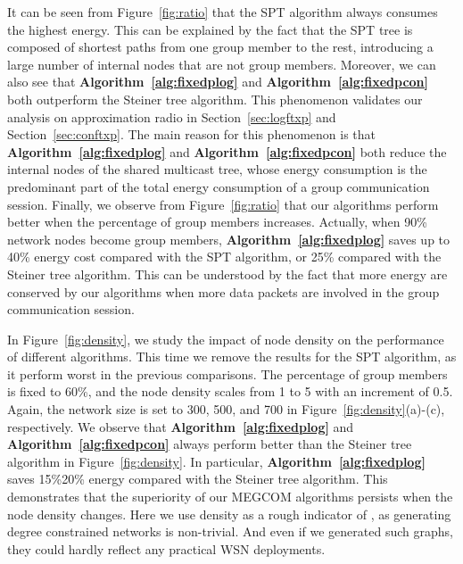 \documentclass[10pt, conference, compsocconf]{IEEEtran}
\begin{document}
It can be seen from Figure~\ref{fig:ratio} that the SPT algorithm always consumes the highest energy. This can be explained by the fact that the SPT tree is composed of shortest paths from one group member to the rest, introducing a large number of internal nodes that are not group members. Moreover, we can also see that \textbf{Algorithm~\ref{alg:fixedplog}} and \textbf{Algorithm~\ref{alg:fixedpcon}} both outperform the Steiner tree algorithm. This phenomenon validates our analysis on approximation radio in Section~\ref{sec:logftxp} and Section~\ref{sec:conftxp}. The main reason for this phenomenon is that \textbf{Algorithm~\ref{alg:fixedplog}} and \textbf{Algorithm~\ref{alg:fixedpcon}} both reduce the internal nodes of the shared multicast tree, whose energy consumption is the predominant part of the total energy consumption of a group communication session. Finally, we observe from Figure~\ref{fig:ratio} that our algorithms perform better when the percentage of group members increases. Actually, when 90\% network nodes become group members, \textbf{Algorithm~\ref{alg:fixedplog}} saves up to 40\% energy cost compared with the SPT algorithm, or 25\% compared with the Steiner tree algorithm. This can be understood by the fact that more energy are conserved by our algorithms when more data packets are involved in the group communication session.

  In Figure~\ref{fig:density}, we study the impact of node density on the performance of different algorithms. This time we remove the results for the SPT algorithm, as it perform worst in the previous comparisons. The percentage of group members is fixed to 60\%, and the node density scales from 1 to 5 with an increment of 0.5. Again, the network size is set to 300, 500, and 700 in Figure~\ref{fig:density}(a)-(c), respectively. We observe that \textbf{Algorithm~\ref{alg:fixedplog}} and \textbf{Algorithm~\ref{alg:fixedpcon}} always perform better than the Steiner tree algorithm in Figure~\ref{fig:density}. In particular, \textbf{Algorithm~\ref{alg:fixedplog}} saves 15\%20\% energy compared with the Steiner tree algorithm. This demonstrates that the superiority of our MEGCOM algorithms persists when the node density changes. Here we use density as a rough indicator of , as generating degree constrained networks is non-trivial. And even if we generated such graphs, they could hardly reflect any practical WSN deployments.
\end{document}
